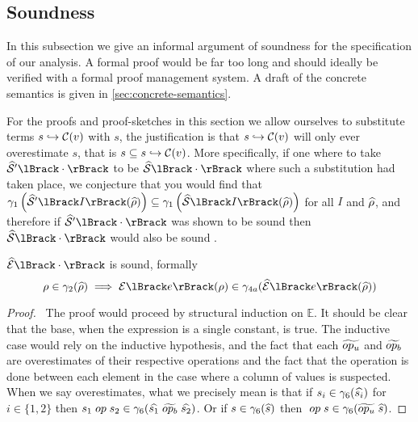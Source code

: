 \subsection{Soundness}\label{subsec:soundness}

In this subsection we give an informal argument of soundness for the specification of our analysis.
A formal proof would be far too long and should ideally be verified with a formal proof management system.
A draft of the concrete semantics is given in \autoref{sec:concrete-semantics}.

For the proofs and proof-sketches in this section we allow ourselves to substitute terms $s \hookrightarrow \mathcal{C}(v)$ with $s$, the justification is that $s \hookrightarrow \mathcal{C}(v)$ will only ever overestimate $s$, that is $s \subseteq s \hookrightarrow \mathcal{C}(v)$.
More specifically, if one where to take $\ab{\mathcal{S}}'\lBrack\cdot\rBrack$ to be $\abssem{\cdot}$ where such a substitution had taken place, we conjecture that you would find that $\concrete_1 \left( \ab{\mathcal{S}}'\lBrack I \rBrack (\ab{\environment})\right) \subseteq \concrete_1 \left( \abssem{I}(\ab{\environment}) \right)$ for all $I$ and $\widehat{\rho}$, and therefore if $\ab{\mathcal{S}}'\lBrack \cdot \rBrack$ was shown to be sound then $\abssem{\cdot}$ would also be sound .

\begin{conjecture}\label{thm:sound-exp}
    $\absexpsem{\cdot}$ is sound, formally
    \begin{equation*}
        \environment \in \concrete_2(\ab{\environment}) \implies \expsem{e}(\environment) \in \concrete_{4a}(\absexpsem{e}(\ab{\environment}))
    \end{equation*}
\end{conjecture}

\begin{proof}
    \pfsketch\
    The proof would proceed by structural induction on $\mathbb{E}$.
    It should be clear that the base, when the expression is a single constant, is true.
    The inductive case would rely on the inductive hypothesis, and the fact that each $\widetilde{op_u}$ and $\widetilde{op_b}$ are overestimates of their respective operations and the fact that the operation is done between each element in the case where a column of values is suspected.
    When we say overestimates, what we precisely mean is that if $s_i \in \gamma_6(\widehat{s_i})$ for $i \in \{1, 2\}$ then $s_1 \;op\; s_2 \in \gamma_6(\widehat{s_1} \; \widetilde{op_b} \; \widehat{s_2})$.
    Or if $s \in \gamma_6(\widehat{s})$ then $\;op\; s \in \gamma_6(\widetilde{op_u} \; \widehat{s})$.
\end{proof}


